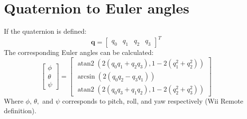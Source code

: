 \chapter{Quaternion to Euler angles}
\label{app:eulerConversion}
If the quaternion is defined:
\[
\mathbf{q} = \left[ \begin{array}{cccc} q_0 & q_1 & q_2 & q_3 \end{array} \right ]^T
\]
The corresponding Euler angles can be calculated:
\[
\left [ \begin{array}{c} \phi  \\ \theta  \\ \psi  \end{array} \right ] = \left [ \begin{array}{c} \operatorname{atan2}(2(q_0 q_1 + q_2 q_3), 1 - 2(q_{1}^2 + q_{2}^2)) \\ \arcsin(2(q_0 q_2 - q_3 q_1)) \\ \operatorname{atan2}(2(q_0 q_3 + q_1 q_2), 1- 2(q_2^2 + q_3^2))\end{array} \right ]
\]
Where $\phi,\, \theta,$ and $ \psi$ corresponds to pitch, roll, and yaw respectively (Wii Remote definition).

